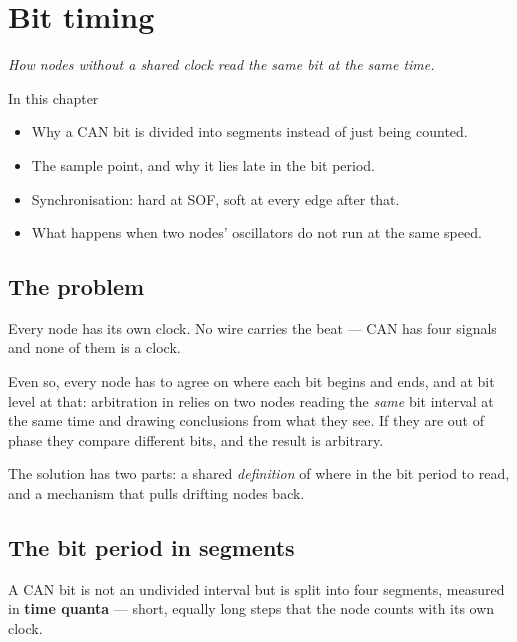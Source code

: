 \chapter{Bit timing}
\label{ch:tajming}

{\large\itshape How nodes without a shared clock read the same bit at the same time.\par}

\begin{chapterbox}{In this chapter}
\begin{itemize}
  \item Why a CAN bit is divided into segments instead of just being counted.
  \item The sample point, and why it lies late in the bit period.
  \item Synchronisation: hard at SOF, soft at every edge after that.
  \item What happens when two nodes' oscillators do not run at the same speed.
\end{itemize}
\end{chapterbox}

\section{The problem}

Every node has its own clock. No wire carries the beat --- CAN has four signals and none of them is
a clock.

Even so, every node has to agree on where each bit begins and ends, and at bit level at that:
arbitration in  relies on two nodes reading the \emph{same} bit interval at
the same time and drawing conclusions from what they see. If they are out of phase they compare
different bits, and the result is arbitrary.

The solution has two parts: a shared \emph{definition} of where in the bit period to read, and a
mechanism that pulls drifting nodes back.

\section{The bit period in segments}

A CAN bit is not an undivided interval but is split into four segments, measured in
\textbf{time quanta} --- short, equally long steps that the node counts with its own clock.


